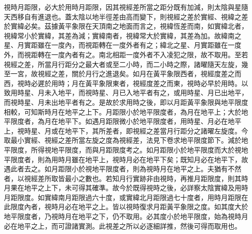 \begin{pinyinscope}
視時月距限，必大於用時月距限，因其視經差所當之距分既有加減，則太陰與星隨天西移自有進退也。蓋太陰以地半徑差由高而變下，則視經之差於實經、視緯之差於實緯必矣。茲據黃平象限在天頂南之地面而言之，視緯恆差而南，如實緯北者，視緯常小於實緯，其差為減；實緯南者，視緯常大於實緯，其差為加。故緯南之星、月實距雖在一度內，而視距轉在一度外者有之；緯北之星、月實距雖在一度外，而視距轉在一度內者有之。南北相距一度外者不入凌犯之限，故不取用。至若視經之差，所當月行距分之最大者或至二小時，而二小時之際，諸曜隨天左旋，幾至一宮，故視經之差，關於月行之進退矣。如月在黃平象限西者，視經度差之而西，視時必遲於用時；月在黃平象限東者，視經度差之而東，視時必早於用時。以致用時星、月未入地平，而視時星、月已入地平者有之，或用時星、月已出地平，而視時星、月未出地平者有之。是故於求用時之後，即以月距黃平象限與地平限度相較，可知斯時月在地平之上下。月距限小於地平限度者，為月在地平上；大於地平限度者，為月在地平下。如遇月距限微小於地平限度者，用時星、月必在地平上，視時星、月或在地平下，其所差者，即視經之差當月行距分之諸曜左旋度。今取最小實經、視經之差所當左旋之度為視經差，法見下卷求地平限度節下。減於地平限度，所得視地平限度，而與月距限度考之。如月距限小於地平限度而大於視地平限度者，則為用時月雖在地平上，視時月必在地平下矣；既知月必在地平下，故遇此者去之。如月距限小於視地平限度者，則為視時月在地平之上。夫猶有不然者，以視經差所取皆最小之數也。若知月行實跡非由視時，再推月距限度，則其時月果在地平之上下，未可得其確準。故今於既得視時之後，必詳察太陰實緯及用時月距限度。如實緯南月距限過六十度，或實緯北月距限過七十度者，用時月距限在此限度內者，視時月必在地平之上。皆以視時復求月距黃平象限之度。如其度大於地平限度者，乃視時月在地平之下，仍不取用。必其度小於地平限度，始為視時月必在地平之上，而可證諸實測。此視差之所以必逐細詳推，然後可得而取用也。


\end{pinyinscope}